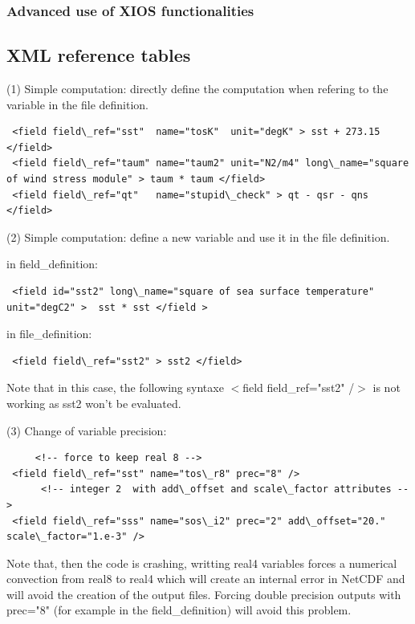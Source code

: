\subsubsection{Advanced use of XIOS functionalities}

\subsection{XML reference tables}
\label{IOM_xmlref}

(1) Simple computation: directly define the computation when refering to the variable in the file definition.

\vspace{-20pt}
\begin{alltt}  {{\scriptsize    
\begin{verbatim}
 <field field\_ref="sst"  name="tosK"  unit="degK" > sst + 273.15 </field>
 <field field\_ref="taum" name="taum2" unit="N2/m4" long\_name="square of wind stress module" > taum * taum </field>
 <field field\_ref="qt"   name="stupid\_check" > qt - qsr - qns </field>
\end{verbatim}
}}\end{alltt} 

(2) Simple computation: define a new variable and use it in the file definition.

in field\_definition:
\vspace{-20pt}
\begin{alltt}  {{\scriptsize    
\begin{verbatim}
 <field id="sst2" long\_name="square of sea surface temperature" unit="degC2" >  sst * sst </field >
\end{verbatim}
}}\end{alltt} 
in file\_definition:
\vspace{-20pt}
\begin{alltt}  {{\scriptsize    
\begin{verbatim}
 <field field\_ref="sst2" > sst2 </field>
\end{verbatim}
}}\end{alltt} 
Note that in this case, the following syntaxe $<$field field\_ref="sst2" /$>$ is not working as sst2 won't be evaluated.

(3) Change of variable precision:

\vspace{-20pt}
\begin{alltt}  {{\scriptsize    
\begin{verbatim}
     <!-- force to keep real 8 -->
 <field field\_ref="sst" name="tos\_r8" prec="8" />
      <!-- integer 2  with add\_offset and scale\_factor attributes -->
 <field field\_ref="sss" name="sos\_i2" prec="2" add\_offset="20." scale\_factor="1.e-3" />
\end{verbatim}
}}\end{alltt} 
Note that, then the code is crashing, writting real4 variables forces a numerical convection from real8 to real4 which will create an internal error in NetCDF and will avoid the creation of the output files. Forcing double precision outputs with prec="8" (for example in the field\_definition) will avoid this problem.

